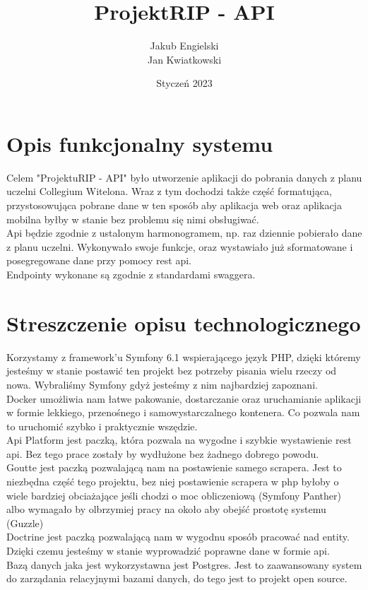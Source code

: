 \documentclass{article}
\title{Projekt\textunderscore RIP - API}
\author{
Jakub Engielski\\
Jan Kwiatkowski \\
}
\date{Styczeń 2023}
\begin{document}
\maketitle

\section{Opis funkcjonalny systemu}
Celem "Projektu\textunderscore RIP - API" było utworzenie aplikacji do pobrania danych z planu uczelni Collegium Witelona. Wraz z tym dochodzi także część formatująca, przystosowująca pobrane dane w ten sposób aby aplikacja web oraz aplikacja mobilna byłby w stanie bez problemu się nimi obsługiwać.
\\Api będzie zgodnie z ustalonym harmonogramem, np. raz dziennie pobierało dane z planu uczelni. Wykonywało swoje funkcje, oraz wystawiało już sformatowane i posegregowane dane przy pomocy rest api.
\\Endpointy wykonane są zgodnie z standardami swaggera. 


\section{Streszczenie opisu technologicznego}
Korzystamy z framework'u Symfony 6.1 wspierającego język PHP, dzięki któremy jesteśmy w stanie postawić ten projekt bez potrzeby pisania wielu rzeczy od nowa. Wybraliśmy Symfony gdyż jesteśmy z nim najbardziej zapoznani. \\
Docker umożliwia nam łatwe pakowanie, dostarczanie oraz uruchamianie aplikacji w formie lekkiego, przenośnego i samowystarczalnego kontenera. Co pozwala nam to uruchomić szybko i praktycznie wszędzie.
\\
Api Platform jest paczką, która pozwala na wygodne i szybkie wystawienie rest api. Bez tego prace zostały by wydłużone bez żadnego dobrego powodu. 
\\
Goutte jest paczką pozwalającą nam na postawienie samego scrapera. Jest to niezbędna część tego projektu, bez niej postawienie scrapera w php byłoby o wiele bardziej obciażające jeśli chodzi o moc obliczeniową (Symfony Panther) albo wymagało by olbrzymiej pracy na około aby obejść prostotę systemu (Guzzle)
\\
Doctrine jest paczką pozwalającą nam w wygodnu sposób pracować nad entity. Dzięki czemu jesteśmy w stanie wyprowadzić poprawne dane w formie api.
\\
Bazą danych jaka jest wykorzystawna jest Postgres. Jest to zaawansowany system do zarządania relacyjnymi bazami danych, do tego jest to projekt open source.
\end{document}
